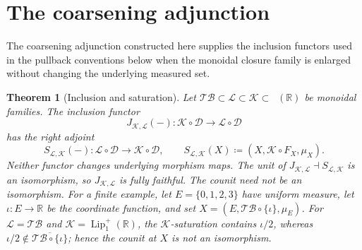 \documentclass{amsart}
\theoremstyle{plain}
\newtheorem{theorem}{Theorem}[section]
\theoremstyle{definition}
\theoremstyle{remark}
\newcommand{\R}{\mathbb{R}}
\newcommand{\D}{\mathcal{D}}
\renewcommand{\L}{\mathcal{L}}
\newcommand{\K}{\mathcal{K}}
\newcommand{\TB}{\mathcal{TB}}
\newcommand{\Lup}{\operatorname{Lip}^{+}_{1}(\R)}
\DeclareMathOperator{\lipone}{Lip_1}
\begin{document}
\appendix

\section{The coarsening adjunction}
\label{app:coarsening}
\label{sec:coarsening}

The coarsening adjunction constructed here supplies the inclusion functors
used in the pullback conventions below when the monoidal closure family is
enlarged without changing the underlying measured set.

\begin{theorem}[Inclusion and saturation]
\label{thm:coarsening-adjunction}
Let $\TB\subset\L\subset\K\subset\lipone(\R)$ be monoidal families.  The
inclusion functor
\[
J_{\K,\L}(-)\colon\K\circ\D\longrightarrow\L\circ\D
\]
has the right adjoint
\[
S_{\L,\K}(-)\colon\L\circ\D\longrightarrow\K\circ\D,\qquad
S_{\L,\K}(X)\coloneqq(X,\K\circ F_X,\mu_X).
\]
Neither functor changes underlying morphism maps.  The unit of
$J_{\K,\L}\dashv S_{\L,\K}$ is an isomorphism, so $J_{\K,\L}$ is fully
faithful.  The counit need not be an isomorphism.  For a finite example,
let $E=\{0,1,2,3\}$ have uniform measure, let
$\iota\colon E\to\R$ be the coordinate function, and set
$X=(E,\TB\circ\{\iota\},\mu_E)$.  For $\L=\TB$ and $\K=\Lup$, the
$\K$-saturation contains $\iota/2$, whereas
$\iota/2\notin\overline{\TB\circ\{\iota\}}$; hence the counit at $X$ is
not an isomorphism.
\end{theorem}
\end{document}
